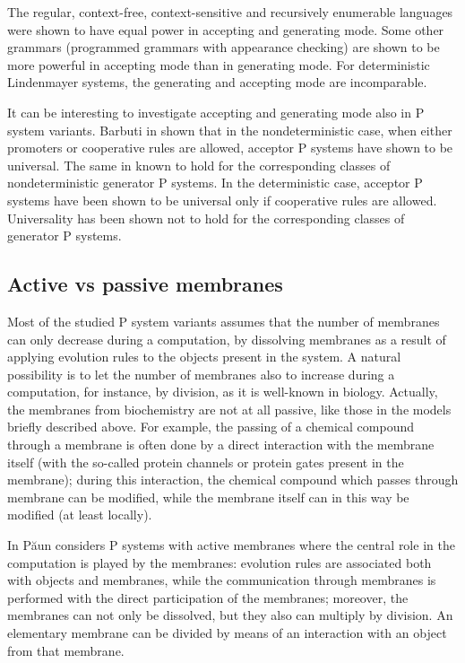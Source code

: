 The regular, context-free, context-sensitive and recursively enumerable languages were shown to have equal power in accepting and generating mode.
Some other grammars (programmed grammars with appearance checking) are shown to be more powerful in accepting mode than in generating mode.
For deterministic Lindenmayer systems, the generating and accepting mode are incomparable.


It can be interesting to investigate accepting and generating mode also in P system variants. Barbuti in \cite{Barbuti:2010:AcceptingGenerating} shown that in the nondeterministic case, when either promoters or cooperative rules are allowed, acceptor P systems have shown to be universal. The same in known to hold for the corresponding classes of nondeterministic generator P systems. In the deterministic case, acceptor P systems have been shown to be universal only if cooperative rules are allowed. Universality has been shown not to hold for the corresponding classes of generator P systems.


\subsection{Active vs passive membranes} %
\label{sub:active_vs_passive_membranes}

Most of the studied P system variants assumes that the number of membranes can only decrease during a computation, by dissolving membranes as a result of applying evolution rules to the objects present in the system.
A natural possibility is to let the number of membranes also to increase during a computation, for instance, by division, as it is well-known in biology. Actually, the membranes from biochemistry are not at all passive, like those in the models briefly described above.
For example, the passing of a chemical compound through a membrane is often done by a direct interaction with the membrane itself (with the so-called protein channels or protein gates present in the membrane); during this interaction, the chemical compound which passes through membrane can be modified, while the membrane itself can in this way be modified (at least locally).

In \cite{Paun99ActiveMembranes} P\u{a}un considers P systems with active membranes where the central role in the computation is played by the membranes: evolution rules are associated both with objects and membranes, while the communication through membranes is performed with the direct participation of the membranes; moreover, the membranes can not only be dissolved, but they also can multiply by division. An elementary membrane can be divided by means of an interaction with an object from that membrane.

